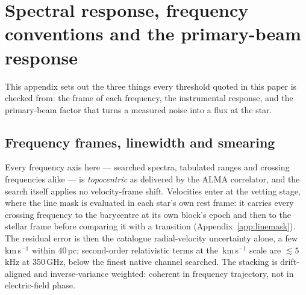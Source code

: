 \section{Spectral response, frequency conventions and the primary-beam
response}
\label{app:conventions}

This appendix sets out the three things every threshold quoted in this paper
is checked from: the frame of each frequency, the instrumental response, and
the primary-beam factor that turns a measured noise into a flux at the star.



\subsection{Frequency frames, linewidth and smearing}

Every frequency axis here --- searched spectra, tabulated ranges and
crossing frequencies alike --- is \emph{topocentric} as delivered by the
ALMA correlator, and the search itself applies no velocity-frame shift.
Velocities enter at the vetting stage, where the line mask is evaluated in
each star's own rest frame: it carries every crossing frequency to the
barycentre at its own block's epoch and then to the stellar frame before
comparing it with a transition (Appendix~\ref{app:linemask}). The residual
error is then the catalogue radial-velocity uncertainty alone, a few
km\,s$^{-1}$ within 40\,pc; second-order relativistic terms at the
\MaskHalfKms\,km\,s$^{-1}$
scale are $\lesssim5$\,kHz at 350\,GHz, below the finest native channel
searched. The stacking is drift-aligned and inverse-variance weighted:
coherent in frequency trajectory, not in electric-field phase.

